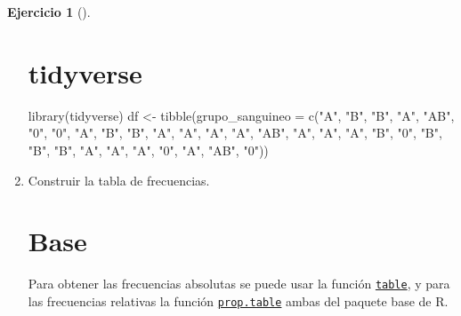 \documentclass[
  spanish,
  a4paper,
]{scrreport}
\newenvironment{Shaded}{\begin{snugshade}}{\end{snugshade}}
\newcommand{\AttributeTok}[1]{\textcolor[rgb]{0.40,0.45,0.13}{#1}}
\newcommand{\FunctionTok}[1]{\textcolor[rgb]{0.28,0.35,0.67}{#1}}
\newcommand{\NormalTok}[1]{\textcolor[rgb]{0.00,0.23,0.31}{#1}}
\newcommand{\OtherTok}[1]{\textcolor[rgb]{0.00,0.23,0.31}{#1}}
\newcommand{\StringTok}[1]{\textcolor[rgb]{0.13,0.47,0.30}{#1}}
\theoremstyle{definition}
\newtheorem{exercise}{Ejercicio}[chapter]
\theoremstyle{remark}
\begin{document}
\begin{exercise}[]
\begin{enumerate}
\begin{tcolorbox}
  \section{tidyverse}

\begin{Shaded}
\begin{Highlighting}[]
\FunctionTok{library}\NormalTok{(tidyverse)}
\NormalTok{df }\OtherTok{\textless{}{-}} \FunctionTok{tibble}\NormalTok{(}\AttributeTok{grupo\_sanguineo =} \FunctionTok{c}\NormalTok{(}\StringTok{"A"}\NormalTok{, }\StringTok{"B"}\NormalTok{, }\StringTok{"B"}\NormalTok{, }\StringTok{"A"}\NormalTok{, }\StringTok{"AB"}\NormalTok{, }\StringTok{"0"}\NormalTok{, }\StringTok{"0"}\NormalTok{, }\StringTok{"A"}\NormalTok{, }\StringTok{"B"}\NormalTok{, }\StringTok{"B"}\NormalTok{, }\StringTok{"A"}\NormalTok{, }\StringTok{"A"}\NormalTok{, }\StringTok{"A"}\NormalTok{, }\StringTok{"A"}\NormalTok{, }\StringTok{"AB"}\NormalTok{, }\StringTok{"A"}\NormalTok{, }\StringTok{"A"}\NormalTok{, }\StringTok{"A"}\NormalTok{, }\StringTok{"B"}\NormalTok{, }\StringTok{"0"}\NormalTok{, }\StringTok{"B"}\NormalTok{, }\StringTok{"B"}\NormalTok{, }\StringTok{"B"}\NormalTok{, }\StringTok{"A"}\NormalTok{, }\StringTok{"A"}\NormalTok{, }\StringTok{"A"}\NormalTok{, }\StringTok{"0"}\NormalTok{, }\StringTok{"A"}\NormalTok{, }\StringTok{"AB"}\NormalTok{, }\StringTok{"0"}\NormalTok{))}
\end{Highlighting}
\end{Shaded}

  \end{tcolorbox}
\item
  Construir la tabla de frecuencias.

  \begin{tcolorbox}[enhanced jigsaw, breakable, leftrule=.75mm, toptitle=1mm, rightrule=.15mm, opacitybacktitle=0.6, left=2mm, colframe=quarto-callout-tip-color-frame, titlerule=0mm, toprule=.15mm, opacityback=0, bottomtitle=1mm, coltitle=black, colbacktitle=quarto-callout-tip-color!10!white, title=\textcolor{quarto-callout-tip-color}{\faLightbulb}\hspace{0.5em}{Solución}, arc=.35mm, bottomrule=.15mm, colback=white]

  \section{Base}

  Para obtener las frecuencias absolutas se puede usar la función
  \href{https://www.rdocumentation.org/packages/base/versions/3.6.2/topics/table}{\texttt{table}},
  y para las frecuencias relativas la función
  \href{https://www.rdocumentation.org/packages/base/versions/3.6.2/topics/prop.table}{\texttt{prop.table}}
  ambas del paquete base de R.


\end{tcolorbox}
\end{enumerate}
\end{exercise}
\end{document}
